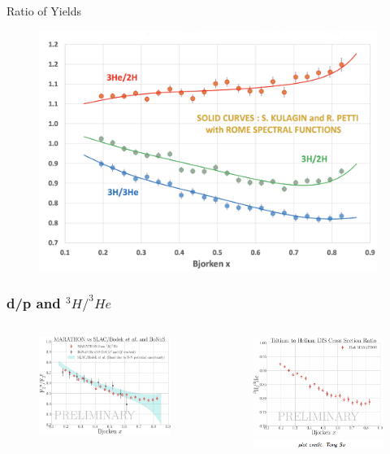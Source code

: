 \documentclass[12pt]{beamer}
\begin{document}
\begin{frame}{Ratio of Yields}
\vspace{-20pt}
\begin{figure}
	\includegraphics[width=11cm]{../images/MARA_rations.pdf}
\end{figure}
\end{frame}


\iffalse

\begin{frame}{}
\frametitle{d/p and $^3H/^3He$}
\vspace{-10pt}
\begin{columns}
	\begin{figure}
		\includegraphics[width=6cm]{../images/MARA_F2.pdf}
	\end{figure}
	\begin{figure}
		\includegraphics[width=6cm]{../images/H_H.png}
	\end{figure}
\end{columns}
\end{frame}
\end{document}
